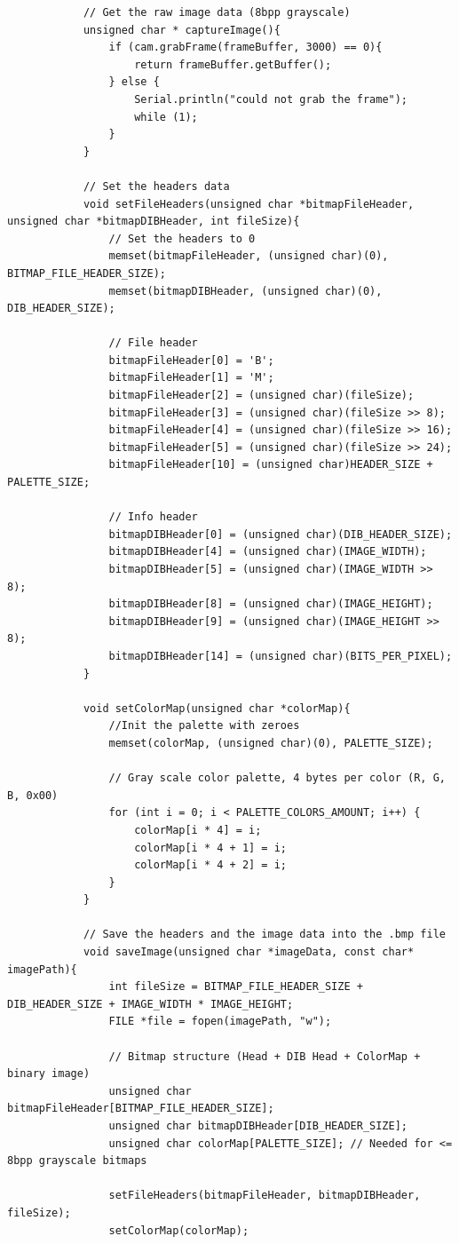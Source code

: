 \documentclass[10pt, a4paper]{beamer}
\begin{document}
\begin{frame}[fragile]
\begin{lstlisting}
			// Get the raw image data (8bpp grayscale)
			unsigned char * captureImage(){
				if (cam.grabFrame(frameBuffer, 3000) == 0){
					return frameBuffer.getBuffer();
				} else {
					Serial.println("could not grab the frame");
					while (1);
				}
			}
			
			// Set the headers data
			void setFileHeaders(unsigned char *bitmapFileHeader, unsigned char *bitmapDIBHeader, int fileSize){
				// Set the headers to 0
				memset(bitmapFileHeader, (unsigned char)(0), BITMAP_FILE_HEADER_SIZE);
				memset(bitmapDIBHeader, (unsigned char)(0), DIB_HEADER_SIZE);
				
				// File header
				bitmapFileHeader[0] = 'B';
				bitmapFileHeader[1] = 'M';
				bitmapFileHeader[2] = (unsigned char)(fileSize);
				bitmapFileHeader[3] = (unsigned char)(fileSize >> 8);
				bitmapFileHeader[4] = (unsigned char)(fileSize >> 16);
				bitmapFileHeader[5] = (unsigned char)(fileSize >> 24);
				bitmapFileHeader[10] = (unsigned char)HEADER_SIZE + PALETTE_SIZE;
				
				// Info header
				bitmapDIBHeader[0] = (unsigned char)(DIB_HEADER_SIZE);
				bitmapDIBHeader[4] = (unsigned char)(IMAGE_WIDTH);
				bitmapDIBHeader[5] = (unsigned char)(IMAGE_WIDTH >> 8);
				bitmapDIBHeader[8] = (unsigned char)(IMAGE_HEIGHT);
				bitmapDIBHeader[9] = (unsigned char)(IMAGE_HEIGHT >> 8);
				bitmapDIBHeader[14] = (unsigned char)(BITS_PER_PIXEL);
			}
			
			void setColorMap(unsigned char *colorMap){
				//Init the palette with zeroes
				memset(colorMap, (unsigned char)(0), PALETTE_SIZE);
				
				// Gray scale color palette, 4 bytes per color (R, G, B, 0x00)
				for (int i = 0; i < PALETTE_COLORS_AMOUNT; i++) {
					colorMap[i * 4] = i;
					colorMap[i * 4 + 1] = i;
					colorMap[i * 4 + 2] = i;
				}
			}
			
			// Save the headers and the image data into the .bmp file
			void saveImage(unsigned char *imageData, const char* imagePath){
				int fileSize = BITMAP_FILE_HEADER_SIZE + DIB_HEADER_SIZE + IMAGE_WIDTH * IMAGE_HEIGHT;
				FILE *file = fopen(imagePath, "w");
				
				// Bitmap structure (Head + DIB Head + ColorMap + binary image)
				unsigned char bitmapFileHeader[BITMAP_FILE_HEADER_SIZE];
				unsigned char bitmapDIBHeader[DIB_HEADER_SIZE];
				unsigned char colorMap[PALETTE_SIZE]; // Needed for <= 8bpp grayscale bitmaps    
				
				setFileHeaders(bitmapFileHeader, bitmapDIBHeader, fileSize);
				setColorMap(colorMap);
				

\end{lstlisting}
\end{frame}
\end{document}
